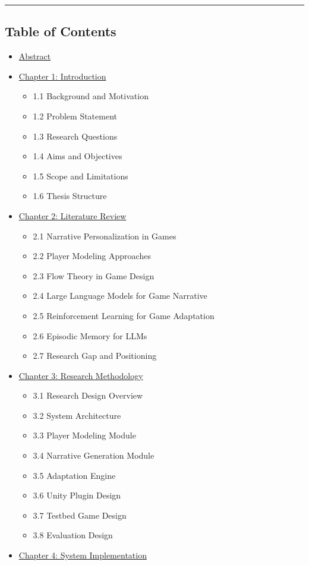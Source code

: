 \begin{center}\rule{0.5\linewidth}{0.5pt}\end{center}

\subsection{Table of Contents}\label{table-of-contents}

\begin{itemize}
\tightlist
\item
  \hyperref[abstract]{Abstract}
\item
  \hyperref[chapter-1-introduction]{Chapter 1: Introduction}

  \begin{itemize}
  \tightlist
  \item
    1.1 Background and Motivation
  \item
    1.2 Problem Statement
  \item
    1.3 Research Questions
  \item
    1.4 Aims and Objectives
  \item
    1.5 Scope and Limitations
  \item
    1.6 Thesis Structure
  \end{itemize}
\item
  \hyperref[chapter-2-literature-review]{Chapter 2: Literature Review}

  \begin{itemize}
  \tightlist
  \item
    2.1 Narrative Personalization in Games
  \item
    2.2 Player Modeling Approaches
  \item
    2.3 Flow Theory in Game Design
  \item
    2.4 Large Language Models for Game Narrative
  \item
    2.5 Reinforcement Learning for Game Adaptation
  \item
    2.6 Episodic Memory for LLMs
  \item
    2.7 Research Gap and Positioning
  \end{itemize}
\item
  \hyperref[chapter-3-research-methodology]{Chapter 3: Research
  Methodology}

  \begin{itemize}
  \tightlist
  \item
    3.1 Research Design Overview
  \item
    3.2 System Architecture
  \item
    3.3 Player Modeling Module
  \item
    3.4 Narrative Generation Module
  \item
    3.5 Adaptation Engine
  \item
    3.6 Unity Plugin Design
  \item
    3.7 Testbed Game Design
  \item
    3.8 Evaluation Design
  \end{itemize}
\item
  \hyperref[chapter-4-system-implementation]{Chapter 4: System
  Implementation}


\end{itemize}

